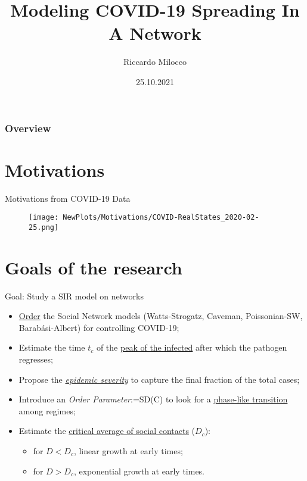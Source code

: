 \documentclass[xcolor={dvipsnames}, aspectratio = 43]{beamer}
\title[Network Covid-19]{Modeling COVID-19 Spreading In A Network} %
\author{Riccardo Milocco} %
\institute[DFA - UniPD] %
{
{\normalsize Prof./Dr. Marco Baiesi} \\
\vspace{1cm}
{\normalsize Università Degli Studi di Padova} \\ %
\medskip
{\normalsize Dipartimento di Fisica e Astronomia G. Galilei} %
}
\date{25.10.2021} %
\begin{document}
\begin{frame}
\titlepage %
\end{frame}

\begin{frame}
\frametitle{Overview} %
\tableofcontents %
\end{frame}

\section{Motivations}
\begin{frame}{Motivations from COVID-19 Data}
	\begin{figure}[h]
		\centering
		\texttt{[image: NewPlots/Motivations/COVID-RealStates\_2020-02-25.png]}
	\end{figure}
\end{frame}

\section{Goals of the research}
\begin{frame}{Goal: Study a SIR model on networks}
\centering
\begin{itemize}
	\item \underline{Order} the Social Network models (Watts-Strogatz, Caveman, Poissonian-SW, Barabási-Albert) for controlling COVID-19; \vfill
	\item Estimate the time $t_c$ of the \underline{peak of the infected} after which the pathogen regresses; \vfill
	\item Propose the \underline{\textit{epidemic severity}} to capture the final fraction of the total cases; \vfill
	\item Introduce an \textit{Order Parameter}:=SD(C) to look for a \underline{phase-like transition} among regimes; \vfill
	\item Estimate the \underline{critical average of social contacts} ($D_c$):
	\begin{itemize}
		\item for $D<D_c$, linear growth at early times;
		\vspace{2mm }
		\item for $D>D_c$, exponential growth at early times.
	\end{itemize}
\end{itemize}
\end{frame}
\end{document}
